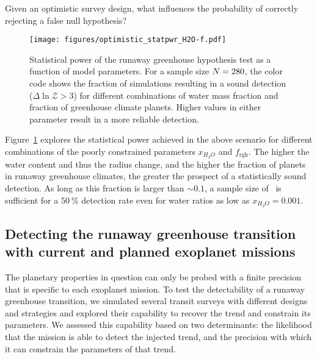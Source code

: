 \documentclass[modern]{aastex631}
\begin{document}
\begin{note}
    Given an optimistic survey design, what influences the probability of correctly rejecting a false null hypothesis?
    \begin{figure}[ht!]
        \begin{centering}
            \texttt{[image: figures/optimistic\_statpwr\_H2O-f.pdf]}
            \caption{
                Statistical power of the runaway greenhouse hypothesis test as a function of model parameters.
                For a sample size $N = 280$, the color code shows the fraction of simulations resulting in a sound detection ($\Delta \ln \mathcal{Z} > 3$) for different combinations of water mass fraction and fraction of greenhouse climate planets.
                Higher values in either parameter result in a more reliable detection.
            }
            \label{fig:statpwr_H2O-f}
        \end{centering}
    \end{figure}
    Figure~\ref{fig:statpwr_H2O-f} explores the statistical power achieved in the above scenario for different combinations of the poorly constrained parameters $x_{H_2O}$ and $f_\mathrm{rgh}$.
    The higher the water content and thus the radius change, and the higher the fraction of planets in runaway greenhouse climates, the greater the prospect of a statistically sound detection.
    As long as this fraction is larger than $\sim 0.1$, a sample size of \Nplanets\ is sufficient for a $\SI{50}{\percent}$ detection rate even for water ratios as low as $x_{H_2O} = 0.001$.
\end{note}



\subsection{Detecting the runaway greenhouse transition with current and planned exoplanet missions}

The planetary properties in question can only be probed with a finite precision that is specific to each exoplanet mission.
To test the detectability of a runaway greenhouse transition, we simulated several transit surveys with different designs and strategies and explored their capability to recover the trend and constrain its parameters.
We assessed this capability based on two determinants: the likelihood that the mission is able to detect the injected trend, and the precision with which it can constrain the parameters of that trend.
\end{document}
